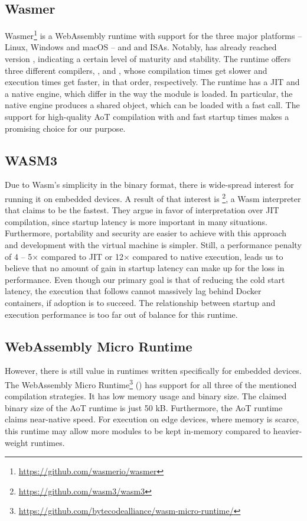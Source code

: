 \subsection{Wasmer}

Wasmer\footnote{\url{https://github.com/wasmerio/wasmer}} is a WebAssembly runtime with support for the three major platforms -- Linux, Windows and macOS -- and  and  ISAs. Notably,  has already reached version , indicating a certain level of maturity and stability. The runtime offers three different compilers, ,  and , whose compilation times get slower and execution times get faster, in that order, respectively. The runtime has a JIT and a native engine, which differ in the way the module is loaded. In particular, the native engine produces a shared object, which can be loaded with a fast  call. The support for high-quality AoT compilation with  and fast startup times makes  a promising choice for our purpose.

\subsection{WASM3}

Due to Wasm's simplicity in the binary format, there is wide-spread interest for running it on embedded devices. A result of that interest is \footnote{\url{https://github.com/wasm3/wasm3}}, a Wasm interpreter that claims to be the fastest. They argue in favor of interpretation over JIT compilation, since startup latency is more important in many situations. Furthermore, portability and security are easier to achieve with this approach and development with the virtual machine is simpler. Still, a performance penalty of 4 -- 5$\times$ compared to JIT or 12$\times$ compared to native execution, leads us to believe that no amount of gain in startup latency can make up for the loss in performance. Even though our primary goal is that of reducing the cold start latency, the execution that follows cannot massively lag behind Docker containers, if adoption is to succeed. The relationship between startup and execution performance is too far out of balance for this runtime.

\subsection{WebAssembly Micro Runtime}

However, there is still value in runtimes written specifically for embedded devices. The WebAssembly Micro Runtime\footnote{\url{https://github.com/bytecodealliance/wasm-micro-runtime/}} () has support for all three of the mentioned compilation strategies. It has low memory usage and binary size. The claimed binary size of the AoT runtime is just 50 kB. Furthermore, the AoT runtime claims near-native speed. For execution on edge devices, where memory is scarce, this runtime may allow more modules to be kept in-memory compared to heavier-weight runtimes.



